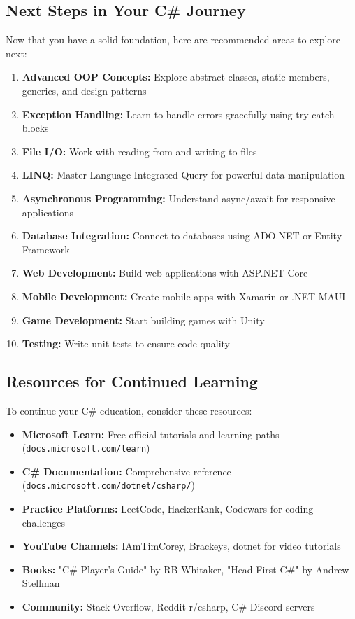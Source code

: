 \documentclass{article}
\begin{document}
\subsection{Next Steps in Your C\# Journey}
Now that you have a solid foundation, here are recommended areas to explore next:

\begin{enumerate}
    \item \textbf{Advanced OOP Concepts:} Explore abstract classes, static members, generics, and design patterns
    \item \textbf{Exception Handling:} Learn to handle errors gracefully using try-catch blocks
    \item \textbf{File I/O:} Work with reading from and writing to files
    \item \textbf{LINQ:} Master Language Integrated Query for powerful data manipulation
    \item \textbf{Asynchronous Programming:} Understand async/await for responsive applications
    \item \textbf{Database Integration:} Connect to databases using ADO.NET or Entity Framework
    \item \textbf{Web Development:} Build web applications with ASP.NET Core
    \item \textbf{Mobile Development:} Create mobile apps with Xamarin or .NET MAUI
    \item \textbf{Game Development:} Start building games with Unity
    \item \textbf{Testing:} Write unit tests to ensure code quality
\end{enumerate}

\subsection{Resources for Continued Learning}
To continue your C\# education, consider these resources:

\begin{itemize}
    \item \textbf{Microsoft Learn:} Free official tutorials and learning paths (\texttt{docs.microsoft.com/learn})
    \item \textbf{C\# Documentation:} Comprehensive reference (\texttt{docs.microsoft.com/dotnet/csharp/})
    \item \textbf{Practice Platforms:} LeetCode, HackerRank, Codewars for coding challenges
    \item \textbf{YouTube Channels:} IAmTimCorey, Brackeys, dotnet for video tutorials
    \item \textbf{Books:} "C\# Player's Guide" by RB Whitaker, "Head First C\#" by Andrew Stellman
    \item \textbf{Community:} Stack Overflow, Reddit r/csharp, C\# Discord servers
\end{itemize}
\end{document}
